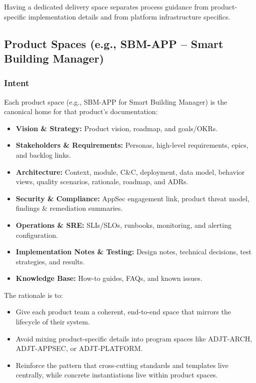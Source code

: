 \documentclass[11pt]{article}
\begin{document}
Having a dedicated delivery space separates process guidance from
product-specific implementation details and from platform
infrastructure specifics.

\subsection{Product Spaces (e.g., SBM-APP -- Smart Building Manager)}

\subsubsection{Intent}

Each product space (e.g., SBM-APP for Smart Building Manager) is the
canonical home for that product's documentation:

\begin{itemize}[leftmargin=*]
  \item \textbf{Vision \& Strategy:} Product vision, roadmap, and
        goals/OKRs.
  \item \textbf{Stakeholders \& Requirements:} Personas, high-level
        requirements, epics, and backlog links.
  \item \textbf{Architecture:} Context, module, C\&C, deployment, data
        model, behavior views, quality scenarios, rationale, roadmap,
        and ADRs.
  \item \textbf{Security \& Compliance:} AppSec engagement link,
        product threat model, findings \& remediation summaries.
  \item \textbf{Operations \& SRE:} SLIs/SLOs, runbooks, monitoring,
        and alerting configuration.
  \item \textbf{Implementation Notes \& Testing:} Design notes,
        technical decisions, test strategies, and results.
  \item \textbf{Knowledge Base:} How-to guides, FAQs, and known issues.
\end{itemize}

The rationale is to:

\begin{itemize}[leftmargin=*]
  \item Give each product team a coherent, end-to-end space that
        mirrors the lifecycle of their system.
  \item Avoid mixing product-specific details into program spaces
        like ADJT-ARCH, ADJT-APPSEC, or ADJT-PLATFORM.
  \item Reinforce the pattern that cross-cutting standards and
        templates live centrally, while concrete instantiations live
        within product spaces.
\end{itemize}
\end{document}
